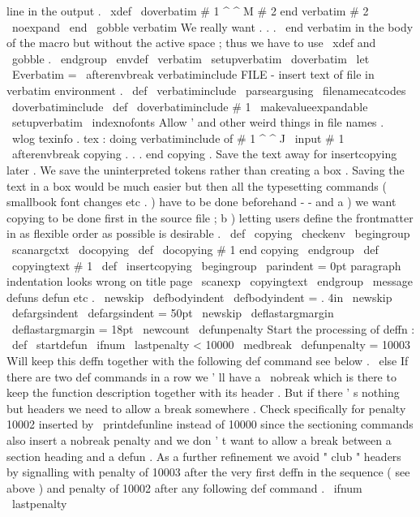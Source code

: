 {{{%
line
in
the
output
.
\
xdef
\
doverbatim
#
1
^
^
M
#
2
end
verbatim
{
#
2
\
noexpand
\
end
\
gobble
verbatim
}
%
%
We
really
want
{
.
.
.
\
end
verbatim
}
in
the
body
of
the
macro
but
%
without
the
active
space
;
thus
we
have
to
use
\
xdef
and
\
gobble
.
\
endgroup
%
\
envdef
\
verbatim
{
%
\
setupverbatim
\
doverbatim
}
\
let
\
Everbatim
=
\
afterenvbreak
%
verbatiminclude
FILE
-
insert
text
of
file
in
verbatim
environment
.
%
\
def
\
verbatiminclude
{
\
parseargusing
\
filenamecatcodes
\
doverbatiminclude
}
%
\
def
\
doverbatiminclude
#
1
{
%
{
%
\
makevalueexpandable
\
setupverbatim
\
indexnofonts
%
Allow
'
and
other
weird
things
in
file
names
.
\
wlog
{
texinfo
.
tex
:
doing
verbatiminclude
of
#
1
^
^
J
}
%
\
input
#
1
\
afterenvbreak
}
%
}
%
copying
.
.
.
end
copying
.
%
Save
the
text
away
for
insertcopying
later
.
%
%
We
save
the
uninterpreted
tokens
rather
than
creating
a
box
.
%
Saving
the
text
in
a
box
would
be
much
easier
but
then
all
the
%
typesetting
commands
(
smallbook
font
changes
etc
.
)
have
to
be
done
%
beforehand
-
-
and
a
)
we
want
copying
to
be
done
first
in
the
source
%
file
;
b
)
letting
users
define
the
frontmatter
in
as
flexible
order
as
%
possible
is
desirable
.
%
\
def
\
copying
{
\
checkenv
{
}
\
begingroup
\
scanargctxt
\
docopying
}
\
def
\
docopying
#
1
end
copying
{
\
endgroup
\
def
\
copyingtext
{
#
1
}
}
%
\
def
\
insertcopying
{
%
\
begingroup
\
parindent
=
0pt
%
paragraph
indentation
looks
wrong
on
title
page
\
scanexp
\
copyingtext
\
endgroup
}
\
message
{
defuns
}
%
defun
etc
.
\
newskip
\
defbodyindent
\
defbodyindent
=
.
4in
\
newskip
\
defargsindent
\
defargsindent
=
50pt
\
newskip
\
deflastargmargin
\
deflastargmargin
=
18pt
\
newcount
\
defunpenalty
%
Start
the
processing
of
deffn
:
\
def
\
startdefun
{
%
\
ifnum
\
lastpenalty
<
10000
\
medbreak
\
defunpenalty
=
10003
%
Will
keep
this
deffn
together
with
the
%
following
def
command
see
below
.
\
else
%
If
there
are
two
def
commands
in
a
row
we
'
ll
have
a
\
nobreak
%
which
is
there
to
keep
the
function
description
together
with
its
%
header
.
But
if
there
'
s
nothing
but
headers
we
need
to
allow
a
%
break
somewhere
.
Check
specifically
for
penalty
10002
inserted
%
by
\
printdefunline
instead
of
10000
since
the
sectioning
%
commands
also
insert
a
nobreak
penalty
and
we
don
'
t
want
to
allow
%
a
break
between
a
section
heading
and
a
defun
.
%
%
As
a
further
refinement
we
avoid
"
club
"
headers
by
signalling
%
with
penalty
of
10003
after
the
very
first
deffn
in
the
%
sequence
(
see
above
)
and
penalty
of
10002
after
any
following
%
def
command
.
\
ifnum
\
lastpenalty
}}}}
